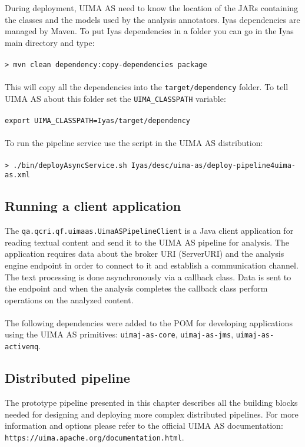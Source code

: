 \documentclass{wileysev}
\begin{document}
During deployment, UIMA AS need to know the location of the JARs containing the classes and the models used by the analysis annotators. Iyas dependencies are managed by Maven. To put Iyas dependencies in a folder you can go in the Iyas main directory and type:
\\\\
\texttt{> mvn clean dependency:copy-dependencies package}
\\\\
This will copy all the dependencies into the \texttt{target/dependency} folder. To tell UIMA AS about this folder set the \texttt{UIMA\_CLASSPATH} variable:
\\\\
\texttt{export UIMA\_CLASSPATH=Iyas/target/dependency}
\\\\
To run the pipeline service use the script in the UIMA AS distribution:
\\\\
\texttt{> ./bin/deployAsyncService.sh Iyas/desc/uima-as/deploy-pipeline4uima-as.xml}

\subsection{Running a client application}
The \texttt{qa.qcri.qf.uimaas.UimaASPipelineClient} is a Java client application for reading textual content and send it to the UIMA AS pipeline for analysis. The application requires data about the broker URI (ServerURI) and the analysis engine endpoint in order to connect to it and establish a communication channel. The text processing is done asynchronously via a callback class. Data is sent to the endpoint and when the analysis completes the callback class perform operations on the analyzed content. 
\\\\
The following dependencies were added to the POM for developing applications using the UIMA AS primitives: \texttt{uimaj-as-core}, \texttt{uimaj-as-jms}, \texttt{uimaj-as-activemq}.

\subsection{Distributed pipeline}
The prototype pipeline presented in this chapter describes all the building blocks needed for designing and deploying more complex distributed pipelines. For more information and options please refer to the official UIMA AS documentation:\\ \texttt{https://uima.apache.org/documentation.html}.
\end{document}
